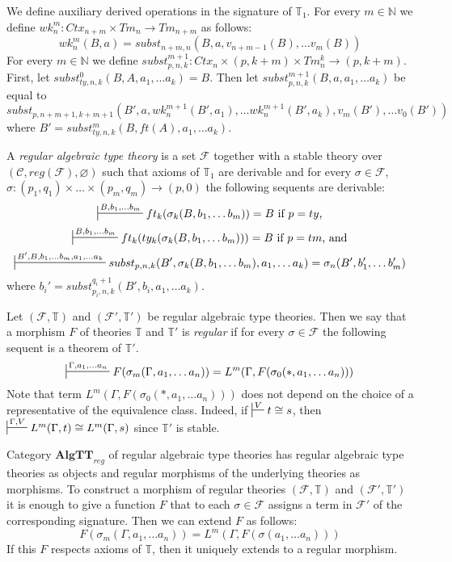 \documentclass[reqno]{amsart}
\theoremstyle{definition}
\theoremstyle{remark}
\newcommand{\cat}[1]{\mathbf{#1}}
\newcommand{\algtt}{\cat{AlgTT}}
\numberwithin{figure}{section}
\begin{document}
We define auxiliary derived operations in the signature of $\mathbb{T}_1$.
For every $m \in \mathbb{N}$ we define $wk^m_n : Ctx_{n+m} \times Tm_n \to Tm_{n+m}$ as follows:
\[ wk^m_n(B,a) = subst_{n+m,n}(B, a, v_{n+m-1}(B), \ldots v_m(B)) \]
For every $m \in \mathbb{N}$ we define $subst^{m+1}_{p,n,k} : Ctx_n \times (p,k+m) \times Tm^k_n \to (p,k+m)$.
First, let $subst^0_{ty,n,k}(B, A, a_1, \ldots a_k) = B$.
Then let $subst^{m+1}_{p,n,k}(B, a, a_1, \ldots a_k)$ be equal to
\[ subst_{p,n+m+1,k+m+1}(B', a, wk^{m+1}_n(B', a_1), \ldots wk^{m+1}_n(B', a_k), v_m(B'), \ldots v_0(B')) \]
where $B' = subst^m_{ty,n,k}(B, ft(A), a_1, \ldots a_k)$.

\begin{defn}
A \emph{regular algebraic type theory} is a set $\mathcal{F}$ together with a stable theory over $(\mathcal{C}, reg(\mathcal{F}), \varnothing)$
such that axioms of $\mathbb{T}_1$ are derivable and for every $\sigma \in \mathcal{F}$, $\sigma : (p_1,q_1) \times \ldots \times (p_m,q_m) \to (p,0)$ the following sequents are derivable:
\[ \sststile{}{B, b_1, \ldots b_m} ft_k(\sigma_k(B, b_1, \ldots b_m)) = B \text{ if $p = ty$,} \]
\[ \sststile{}{B, b_1, \ldots b_m} ft_k(ty_k(\sigma_k(B, b_1, \ldots b_m))) = B \text{ if $p = tm$, and} \]
\[ \sststile{}{B', B, b_1, \ldots b_m, a_1, \ldots a_k} subst_{p,n,k}(B', \sigma_k(B, b_1, \ldots b_m), a_1, \ldots a_k) = \sigma_n(B', b_1', \ldots b_m') \]
where $b_i' = subst_{p_i,n,k}^{q_i+1}(B', b_i, a_1, \ldots a_k)$.
\end{defn}

Let $(\mathcal{F},\mathbb{T})$ and $(\mathcal{F}',\mathbb{T}')$ be regular algebraic type theories.
Then we say that a morphism $F$ of theories $\mathbb{T}$ and $\mathbb{T}'$ is \emph{regular} if for every $\sigma \in \mathcal{F}$ the following sequent is a theorem of $\mathbb{T}'$.
\[ \sststile{}{\Gamma, a_1, \ldots a_n} F(\sigma_m(\Gamma, a_1, \ldots a_n)) = L^m(\Gamma, F(\sigma_0(*, a_1, \ldots a_n))) \]
Note that term $L^m(\Gamma, F(\sigma_0(*, a_1, \ldots a_n)))$ does not depend on the choice of a representative of the equivalence class.
Indeed, if $\sststile{}{V} t \cong s$, then $\sststile{}{\Gamma,V} L^m(\Gamma,t) \cong L^m(\Gamma,s)$ since $\mathbb{T}'$ is stable.

Category $\algtt_{reg}$ of regular algebraic type theories has regular algebraic type theories as objects and regular morphisms of the underlying theories as morphisms.
To construct a morphism of regular theories $(\mathcal{F},\mathbb{T})$ and $(\mathcal{F}',\mathbb{T}')$ it is enough to give a function $F$ that to each $\sigma \in \mathcal{F}$ assigns a term in $\mathcal{F}'$ of the corresponding signature.
Then we can extend $F$ as follows:
\[ F(\sigma_m(\Gamma, a_1, \ldots a_n)) = L^m(\Gamma, F(\sigma(a_1, \ldots a_n))) \]
If this $F$ respects axioms of $\mathbb{T}$, then it uniquely extends to a regular morphism.
\end{document}
